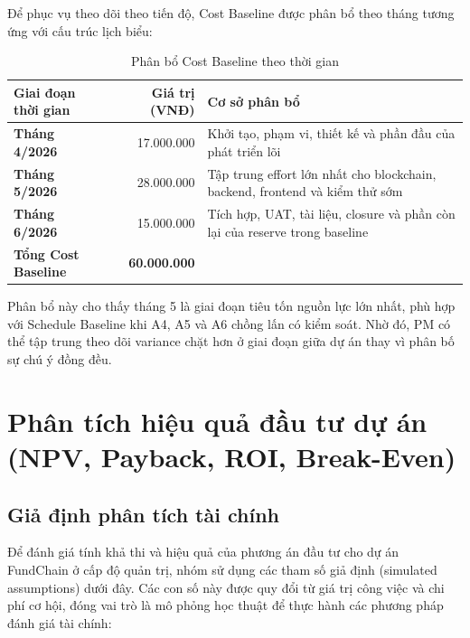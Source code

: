 Để phục vụ theo dõi theo tiến độ, Cost Baseline được phân bổ theo tháng tương ứng với cấu trúc lịch biểu:

\begin{table}[H]
\centering
\caption{Phân bổ Cost Baseline theo thời gian}
\label{tab:cost-baseline-phasing}
\begin{tabularx}{\textwidth}{| >{\bfseries}p{3cm} | r | X |}
\hline
Giai đoạn thời gian & Giá trị (VNĐ) & Cơ sở phân bổ \\
\hline
Tháng 4/2026 & 17.000.000 & Khởi tạo, phạm vi, thiết kế và phần đầu của phát triển lõi \\ \hline
Tháng 5/2026 & 28.000.000 & Tập trung effort lớn nhất cho blockchain, backend, frontend và kiểm thử sớm \\ \hline
Tháng 6/2026 & 15.000.000 & Tích hợp, UAT, tài liệu, closure và phần còn lại của reserve trong baseline \\
\hline
\textbf{Tổng Cost Baseline} & \textbf{60.000.000} &  \\
\hline
\end{tabularx}
\end{table}

Phân bổ này cho thấy tháng 5 là giai đoạn tiêu tốn nguồn lực lớn nhất, phù hợp với Schedule Baseline khi A4, A5 và A6 chồng lấn có kiểm soát. Nhờ đó, PM có thể tập trung theo dõi variance chặt hơn ở giai đoạn giữa dự án thay vì phân bố sự chú ý đồng đều.


\section{Phân tích hiệu quả đầu tư dự án (NPV, Payback, ROI, Break-Even)}

\subsection{Giả định phân tích tài chính}

Để đánh giá tính khả thi và hiệu quả của phương án đầu tư cho dự án FundChain ở cấp độ quản trị, nhóm sử dụng các tham số giả định (simulated assumptions) dưới đây. Các con số này được quy đổi từ giá trị công việc và chi phí cơ hội, đóng vai trò là mô phỏng học thuật để thực hành các phương pháp đánh giá tài chính:

